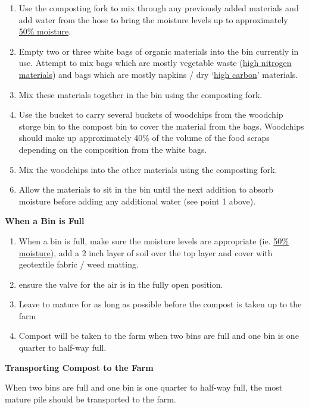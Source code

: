 \begin{enumerate}
\def\labelenumi{\arabic{enumi}.}
\itemsep1pt\parskip0pt
\item
  Use the composting fork to mix through any previously added materials
  and add water from the hose to bring the moisture levels up to
  approximately \hyperref[50moisture]{50\% moisture}.
\item
  Empty two or three white bags of organic materials into the bin
  currently in use. Attempt to mix bags which are mostly vegetable waste
  (\hyperref[highnitrogen]{high nitrogen materials}) and bags which are
  mostly napkins / dry `\hyperref[highcarbon]{high carbon}' materials.
\item
  Mix these materials together in the bin using the composting fork.
\item
  Use the bucket to carry several buckets of woodchips from the woodchip
  storge bin to the compost bin to cover the material from the bags.
  Woodchips should make up approximately 40\% of the volume of the food
  scraps depending on the composition from the white bags.
\item
  Mix the woodchips into the other materials using the composting fork.
\item
  Allow the materials to sit in the bin until the next addition to
  absorb moisture before adding any additional water (see point 1
  above).
\end{enumerate}

\textbf{When a Bin is Full}

\begin{enumerate}
\def\labelenumi{\arabic{enumi}.}
\itemsep1pt\parskip0pt
\item
  When a bin is full, make sure the moisture levels are appropriate (ie.
  \hyperref[50moisture]{50\% moisture}), add a 2 inch layer of soil over
  the top layer and cover with geotextile fabric / weed matting.
\item
  ensure the valve for the air is in the fully open position.
\item
  Leave to mature for as long as possible before the compost is taken up
  to the farm
\item
  Compost will be taken to the farm when two bins are full and one bin
  is one quarter to half-way full.
\end{enumerate}

\textbf{Transporting Compost to the Farm}

When two bins are full and one bin is one quarter to half-way full, the
most mature pile should be transported to the farm.

